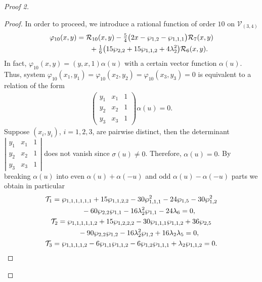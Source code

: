 \documentclass[pdftex]{sigma}
\numberwithin{equation}{section}
\begin{document}
\begin{proof}[Proof 2]
\begin{proof}
In order to proceed, we introduce a rational function of order $10$ {on $\mathcal{V}_{(3,4)}$}
\begin{gather*}
 \varphi_{10}(x,y) = \mathcal{R}_{10}(x,y) -
 \tfrac{5}{4} \bigl(2x - \wp_{1,2} - \wp_{1,1,1}\bigr) \mathcal{R}_{7}(x,y)\\
 \hphantom{\varphi_{10}(x,y) =}{} + \tfrac{1}{6}\bigl(15 \wp_{2,2} + 15\wp_{1,1,2} + 4\lambda_2^2\bigr) \mathcal{R}_{6}(x,y).
\end{gather*}
In fact, $\varphi_{10}(x,y)=(y,x,1)\alpha(u)$ with a certain vector function $\alpha(u)$. Thus, system $\varphi_{10}(x_1,y_1)= \varphi_{10}(x_2,y_2)= \varphi_{10}(x_3,y_3)=0$ is equivalent to a relation of the form
\begin{gather*}
 \begin{pmatrix}
 y_1 & x_1 & 1 \\ y_2 & x_2 & 1\\ y_3 & x_3 & 1
 \end{pmatrix} \alpha (u) = 0.
\end{gather*}
Suppose $(x_i,y_i)$, $i=1,2,3$, are pairwise distinct, then the determinant $\left|\begin{smallmatrix} y_1 & x_1 & 1 \\ y_2 & x_2 & 1\\ y_3 & x_3 & 1 \end{smallmatrix}\right|$ does not vanish since $\sigma(u)\neq 0$. Therefore, $\alpha(u)=0$. By breaking $\alpha (u)$ into even $\alpha (u) + \alpha (-u)$ and odd $\alpha (u) - \alpha (-u)$ parts we obtain in particular
\begin{subequations}
\begin{gather}
 \mathcal{T}_1 = \wp_{1,1,1,1,1,1} + 15\wp_{1,1,2,2} - 30\wp_{1,1,1}^2 - 24\wp_{1,5} -30 \wp_{1,2}^2\nonumber\\
 \hphantom{\mathcal{T}_1 =}{} - 60\wp_{2,2}\wp_{1,1} - 16\lambda_2^2 \wp_{1,1} - 24 \lambda_6 = 0, \label{EvenRel1C34}\\
 \mathcal{T}_2 = \wp_{1,1,1,1,1,2} + 15\wp_{1,2,2,2} - 30\wp_{1,1,1}\wp_{1,1,2} + 36\wp_{2,5}\nonumber\\
 \hphantom{\mathcal{T}_2 =}{} - 90 \wp_{2,2}\wp_{1,2} - 16\lambda_2^2 \wp_{1,2} + 16 \lambda_2 \lambda_5 = 0 , \label{EvenRel2C34}\\
 \mathcal{T}_3 = \wp_{1,1,1,1,2} - 6\wp_{1,1}\wp_{1,1,2} - 6\wp_{1,2}\wp_{1,1,1} + \lambda_2 \wp_{1,1,2} = 0. \label{OddRelC34}
\end{gather}
\end{subequations}


\end{proof}
\end{proof}
\end{document}
